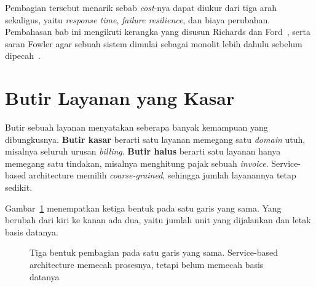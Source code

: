 Pembagian tersebut menarik sebab \textit{cost}-nya dapat diukur dari tiga arah
sekaligus, yaitu \textit{response time}, \textit{failure resilience}, dan biaya
perubahan. Pembahasan bab ini mengikuti kerangka yang disusun Richards dan
Ford~\cite{richards2020fundamentals}, serta saran Fowler agar sebuah sistem
dimulai sebagai monolit lebih dahulu sebelum
dipecah~\cite{fowler2015monolithfirst}.

\section{Butir Layanan yang Kasar}

Butir sebuah layanan menyatakan seberapa banyak kemampuan yang dibungkusnya.
\textbf{Butir kasar} berarti satu layanan memegang satu \textit{domain} utuh,
misalnya seluruh urusan \textit{billing}. \textbf{Butir halus} berarti satu layanan
hanya memegang satu tindakan, misalnya menghitung pajak sebuah \textit{invoice}.
Service-based architecture memilih \textit{coarse-grained}, sehingga jumlah layanannya
tetap sedikit.

Gambar~\ref{fig:butir-layanan} menempatkan ketiga bentuk pada satu garis yang
sama. Yang berubah dari kiri ke kanan ada dua, yaitu jumlah unit yang
dijalankan dan letak basis datanya.

\begin{figure}[htbp]
  \centering
  \caption{Tiga bentuk pembagian pada satu garis yang sama. Service-based
    architecture memecah prosesnya, tetapi belum memecah basis datanya}
  \label{fig:butir-layanan}
\end{figure}

